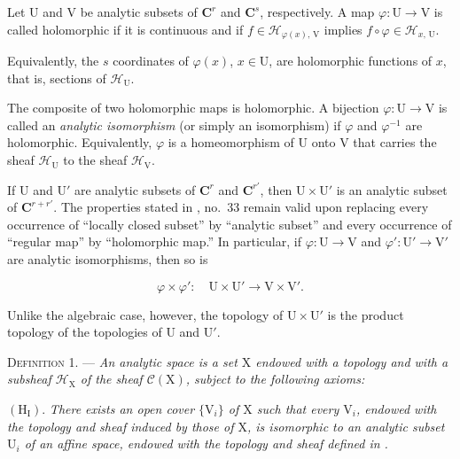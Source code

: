 Let $\mathrm{U}$ and $\mathrm{V}$ be analytic subsets of $\mathbf{C}^r$ and $\mathbf{C}^s$, respectively. A map $\varphi:\mathrm{U}\to\mathrm{V}$ is called holomorphic if it is continuous and if $f\in\mathcal{H}_{\varphi(x),\,\mathrm{V}}$ implies $f\circ\varphi\in\mathcal{H}_{x,\,\mathrm{U}}$.

Equivalently, the $s$ coordinates of $\varphi(x)$, $x\in\mathrm{U}$, are holomorphic functions of $x$, that is, sections of $\mathcal{H}_{\mathrm{U}}$.

The composite of two holomorphic maps is holomorphic. A bijection $\varphi:\mathrm{U}\to\mathrm{V}$ is called an \emph{analytic isomorphism} (or simply an isomorphism) if $\varphi$ and $\varphi^{-1}$ are holomorphic. Equivalently, $\varphi$ is a homeomorphism of $\mathrm{U}$ onto $\mathrm{V}$ that carries the sheaf $\mathcal{H}_{\mathrm{U}}$ to the sheaf $\mathcal{H}_{\mathrm{V}}$.

If $\mathrm{U}$ and $\mathrm{U}'$ are analytic subsets of $\mathbf{C}^r$ and $\mathbf{C}^{r'}$, then $\mathrm{U}\times\mathrm{U}'$ is an analytic subset of $\mathbf{C}^{r+r'}$. The properties stated in , no.~33 remain valid upon replacing every occurrence of ``locally closed subset'' by ``analytic subset'' and every occurrence of ``regular map'' by ``holomorphic map.'' In particular, if $\varphi:\mathrm{U}\to\mathrm{V}$ and $\varphi':\mathrm{U}'\to\mathrm{V}'$ are analytic isomorphisms, then so is

\begin{equation*}
\varphi\times\varphi':\quad \mathrm{U}\times\mathrm{U}'\longrightarrow\mathrm{V}\times\mathrm{V}'.
\end{equation*}

Unlike the algebraic case, however, the topology of $\mathrm{U}\times\mathrm{U}'$ is the product topology of the topologies of $\mathrm{U}$ and $\mathrm{U}'$.


\textsc{Definition 1}. --- \emph{An analytic space is a set $\mathrm{X}$ endowed with a topology and with a subsheaf $\mathcal{H}_{\mathrm{X}}$ of the sheaf $\mathcal{C}(\mathrm{X})$, subject to the following axioms:}

$(\mathrm{H}_{\mathrm{I}})$. \emph{There exists an open cover $\{\mathrm{V}_i\}$ of $\mathrm{X}$ such that every $\mathrm{V}_i$, endowed with the topology and sheaf induced by those of $\mathrm{X}$, is isomorphic to an analytic subset $\mathrm{U}_i$ of an affine space, endowed with the topology and sheaf defined in .}

